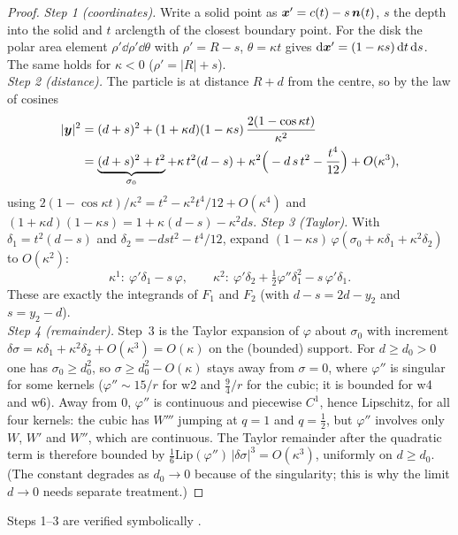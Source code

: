 \begin{proof}
\emph{Step 1 (coordinates).} Write a solid point as $\bm x'=c(t)-s\,\bm n(t)$, $s$ the depth into the solid and $t$ arclength of the closest
boundary point. For the disk the polar area element $\rho'\dd\rho'\dd\theta$ with $\rho'=R-s$, $\theta=\kappa t$ gives
$\mathrm{d}\bm x'=(1-\kappa s)\,\mathrm{d} t\,\mathrm{d} s$. The same holds for $\kappa<0$ ($\rho'=|R|+s$).\\
\emph{Step 2 (distance).} The particle is at distance $R+d$ from the centre, so by the law of cosines
\begin{align*}
 |\bm y|^2&=(d+s)^2+(1+\kappa d)(1-\kappa s)\,\frac{2(1-\cos\kappa t)}{\kappa^2}\\
 &=\underbrace{(d+s)^2+t^2}_{\sigma_0}+\kappa\,t^2(d-s)+\kappa^2\Big(-d\,s\,t^2-\frac{t^4}{12}\Big)+O(\kappa^3),
\end{align*}
using $2(1-\cos\kappa t)/\kappa^2=t^2-\kappa^2t^4/12+O(\kappa^4)$ and $(1+\kappa d)(1-\kappa s)=1+\kappa(d-s)-\kappa^2ds$.
\emph{Step 3 (Taylor).} With $\delta_1=t^2(d-s)$ and $\delta_2=-dst^2-t^4/12$, expand
$(1-\kappa s)\,\varphi(\sigma_0+\kappa\delta_1+\kappa^2\delta_2)$ to $O(\kappa^2)$:
\[
 \kappa^1:\ \varphi'\delta_1-s\,\varphi,\qquad
 \kappa^2:\ \varphi'\delta_2+\tfrac12\varphi''\delta_1^2-s\,\varphi'\delta_1 .
\]
These are exactly the integrands of $F_1$ and $F_2$ (with $d-s=2d-y_2$ and $s=y_2-d$).\\
\emph{Step 4 (remainder).} Step~3 is the Taylor expansion of $\varphi$ about $\sigma_0$ with increment
$\delta\sigma=\kappa\delta_1+\kappa^2\delta_2+O(\kappa^3)=O(\kappa)$ on the (bounded) support. For $d\ge d_0>0$ one has $\sigma_0\ge d_0^2$, so $\sigma\ge d_0^2-O(\kappa)$ stays away from
$\sigma=0$, where $\varphi''$ is singular for some kernels ($\varphi''\sim15/r$ for w2 and $\frac94/r$ for the cubic; it is bounded for w4 and w6). Away from $0$, $\varphi''$ is
continuous and piecewise $C^1$, hence Lipschitz, for all four kernels: the cubic has $W'''$ jumping at $q=1$ and $q=\frac12$, but $\varphi''$ involves
only $W$, $W'$ and $W''$, which are continuous. The Taylor remainder after the quadratic term is therefore bounded by $\frac16\mathrm{Lip}(\varphi'')\,|\delta\sigma|^3=O(\kappa^3)$,
uniformly on $d\ge d_0$. (The constant degrades as $d_0\to0$ because of the singularity; this is why the limit $d\to0$ needs separate treatment.)
\end{proof}
Steps 1--3 are verified symbolically .

